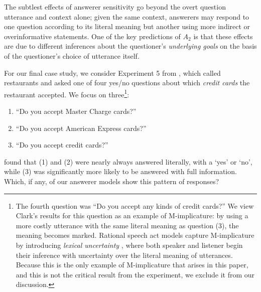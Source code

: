\documentclass[12pt, floatsintext, jou]{apa6}
\begin{document}
The subtlest effects of answerer sensitivity go beyond the overt question utterance and context alone; given the same context, answerers may respond to one question according to its literal meaning but another using more indirect or overinformative statements. One of the key predictions of  $A_2$ is that these effects are due to different inferences about the questioner's \emph{underlying goals} on the basis of the questioner's choice of utterance itself. 

For our final case study, we consider Experiment 5 from , which called restaurants and asked one of four yes/no questions about which \emph{credit cards} the restaurant accepted. We focus on three\footnote{
The fourth question was ``Do you accept any kinds of credit cards?'' We view Clark's results for this question as an example of M-implicature: by using a more costly utterance with the same literal meaning as question (3), the meaning becomes marked. Rational speech act models capture M-implicature by introducing \emph{lexical uncertainty} \cite{BergenGoodmanLevy12_Alternatives}, where both speaker and listener begin their inference with uncertainty over the literal meaning of utterances. %
Because this is the only example of M-implicature that arises in this paper, and this is not the critical result from the experiment, we exclude it from our discussion.%
}:
\begin{enumerate}
\item ``Do you accept Master Charge cards?'' 
\item ``Do you accept American Express cards?''
\item ``Do you accept credit cards?'' 
\end{enumerate}
 found that (1) and (2) were nearly always answered literally, with a `yes' or `no', while (3) was significantly more likely to be answered with full information. Which, if any, of our answerer models show this pattern of responses? %
\end{document}
